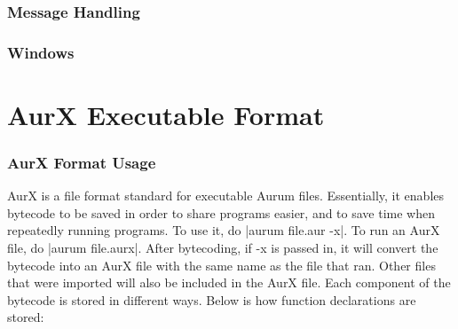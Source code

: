 \documentclass[12pt, letterpaper, oneside]{article}
\begin{document}
		\subsubsection{Message Handling}
		
		\subsubsection{Windows}	
		
	\newpage
	\section{AurX Executable Format}
	\label{misc:aurx}
	\subsubsection{AurX Format Usage}
	AurX is a file format standard for executable Aurum files. Essentially, it enables bytecode to be saved in order to share programs easier, and to save time when repeatedly running programs. To use it, do \spverb|aurum file.aur -x|. To run an AurX file, do \spverb|aurum file.aurx|.
	After bytecoding, if -x is passed in, it will convert the bytecode into an AurX file with the same name as the file that ran. Other files that were imported will also be included in the AurX file. Each component of the bytecode is stored in different ways. Below is how function declarations are stored:
	\newline
\end{document}

